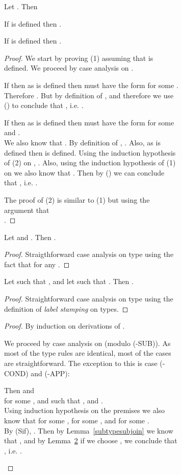\documentclass[authoryear,sort&compress,9pt,twocolumn,nocopyrightspace]{sigplanconf}
\newcommand{\lsec}{\xspace}
\newcommand{\?}{\textsf{\upshape ?}} \newcommand{\consistent}[1]{\widetilde{#1}}
\begin{document}
\begin{figure}[h]
\begin{small}
\begin{figure}[h]
\begin{small}
\begin{lemma}
  \label{subtypesubjoin}
  Let .  Then
  \enumerate
    \item If  is defined then .
    \item If  is defined then .
  \endenumerate
\end{lemma}
\begin{proof}
  We start by proving (1) assuming that  is defined. We proceed by case analysis on .
  \begin{case}[]
    If  then as  is defined then  must have the form  for some . Therefore . But by definition of ,  and therefore we use () to conclude that , i.e. .
  \end{case}

  \begin{case}[]
    If  then as  is defined then  must have the form  for some  and .\\
    We also know that . By definition of , . 
    Also, as  is defined then  is defined. 
    Using the induction hypothesis of (2) on , . Also, using the induction hypothesis of (1) on  we also know that .
    Then by () we can conclude that , i.e. .
  \end{case}

  The proof of (2) is  similar to (1) but using the argument that\\ .
\end{proof}



\begin{lemma}
  \label{subtypeljoin}
  Let  and . Then .
\end{lemma}
\begin{proof}
  Straigthforward case analysis on type  using the fact that  for any .
\end{proof}

\begin{lemma}
  \label{lemma:subtypetwoljoin}
  Let  such that , and let  such that . Then .
\end{lemma}
\begin{proof}
  Straightforward case analysis on type  using the definition of \emph{label stamping} on types.
\end{proof}

\insyntype*
\begin{proof}
  By induction on derivations of .

  We proceed by case analysis on  (modulo (\lsec-SUB)). As most of the type
  rules are identical, most of the cases are straightforward. The exception to
  this is case (\lsec-COND) and (\lsec-APP):
  \begin{case}[\lsec-COND]
    Then  and \\
     for some , and  such that ,  and .\\
    Using induction hypothesis on the premises we also know that  for some ,  for some , and  for some .\\
    By (Sif), .
    Then by Lemma~\ref{subtypesubjoin} we know that , and by Lemma~\ref{lemma:subtypetwoljoin} if we choose , we conclude that , i.e. .
  \end{case}


\end{proof}
\end{small}
\end{figure}
\end{small}
\end{figure}
\end{document}
